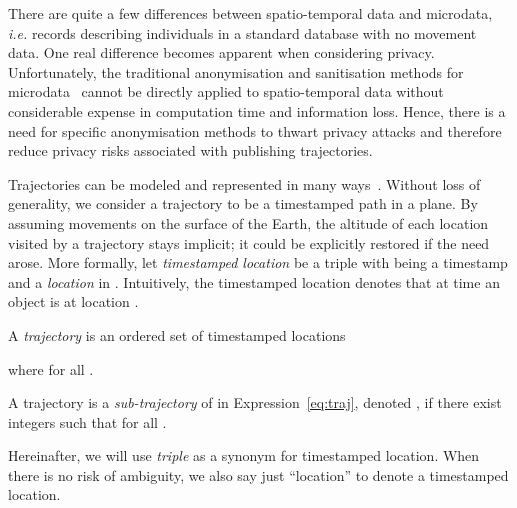 There are quite a few differences between spatio-temporal data and
microdata, {\em i.e.} records describing individuals in a standard
database with no movement data.
One real difference becomes apparent when considering
privacy. Unfortunately, the traditional anonymisation and sanitisation
methods for microdata~\cite{fung10} cannot be directly applied to
spatio-temporal data without considerable expense in computation time and
information loss. Hence, there is a need for specific anonymisation methods
to thwart privacy attacks and therefore reduce privacy risks associated with
publishing trajectories.

Trajectories can be modeled and represented in many ways~\cite{forlizzi00}.
Without loss of generality, we
consider a trajectory to be a timestamped path in a plane. By assuming
movements on the surface of the Earth, the altitude of each location
visited by a trajectory stays implicit; it could be explicitly restored
if the need arose. More formally,
let \emph{timestamped location} be a triple  with  being a
timestamp and
 a \emph{location} in . Intuitively, the
timestamped location denotes
that at time  an object is at location .

\begin{definition}[Trajectory] \label{def:traj}
A \emph{trajectory} is an ordered set of timestamped locations

where  for all .
\end{definition}

\begin{definition}\label{def:subtraj}
A trajectory  is a
\emph{sub-trajectory} of  in Expression~\ref{eq:traj}, denoted
, if there exist
integers  such that  for all .
\end{definition}

Hereinafter, we will use {\em triple} as a synonym for
timestamped location.
When there is no risk of ambiguity,
we also say just ``location'' to denote a timestamped location.

